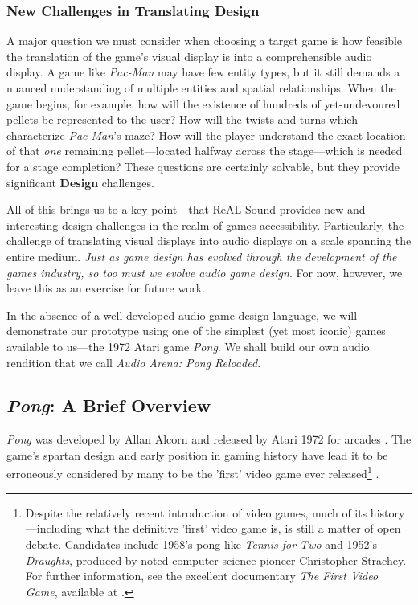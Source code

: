 \documentclass{report}
\newcommand{\rs}{ReAL Sound\xspace}
\newcommand{\design}{\textbf{Design}\xspace}
\begin{document}
\subsubsection{New Challenges in Translating Design}

A major question we must consider when choosing a target game is how feasible the translation of the game's visual display is into a comprehensible audio display. A game like \emph{Pac-Man} may have few entity types, but it still demands a nuanced understanding of multiple entities and spatial relationships. When the game begins, for example, how will the existence of hundreds of yet-undevoured pellets be represented to the user? How will the twists and turns which characterize \emph{Pac-Man}'s maze? How will the player understand the exact location of that \emph{one} remaining pellet---located halfway across the stage---which is needed for a stage completion? These questions are certainly solvable, but they provide significant \design challenges. 

All of this brings us to a key point---that \rs provides new and interesting design challenges in the realm of games accessibility. Particularly, the challenge of translating visual displays into audio displays on a scale spanning the entire medium. \emph{Just as game design has evolved through the development of the games industry, so too must we evolve audio game design}. For now, however, we leave this as an exercise for future work.

In the absence of a well-developed audio game design language, we will demonstrate our prototype using one of the simplest (yet most iconic) games available to us---the 1972 Atari game \emph{Pong}. We shall build our own audio rendition that we call \emph{Audio Arena: Pong Reloaded}.

\subsection{\emph{Pong}: A Brief Overview}
\emph{Pong} was developed by Allan Alcorn and released by Atari 1972 for arcades \cite{o2015pillars}. The game's spartan design and early position in gaming history have lead it to be erroneously considered by many to be the 'first' video game ever released\footnote{Despite the relatively recent introduction of video games, much of its history---including what the definitive 'first' video game is, is still a matter of open debate. Candidates include 1958's pong-like \emph{Tennis for Two} \cite{de2015tennis} and 1952's \emph{Draughts}, produced by noted computer science pioneer Christopher Strachey. For further information, see the excellent documentary \emph{The First Video Game}, available at \cite{Ahoy_2019}.} \cite{raessens2011handbook}. 
\end{document}
